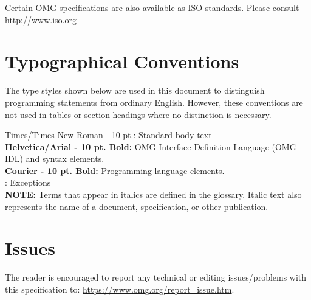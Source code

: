 Certain OMG specifications are also available as ISO standards. Please consult \url{http://www.iso.org} 

\section*{Typographical Conventions}
The type styles shown below are used in this document to distinguish programming statements from ordinary English. However, these conventions are not used in tables or section headings where no distinction is necessary.

Times/Times New Roman - 10 pt.:  Standard body text\\[\medskipamount]
{\small\sffamily\bfseries{Helvetica/Arial - 10 pt. Bold:}} OMG Interface Definition Language (OMG IDL) and syntax 
elements.\\[\medskipamount]
{\ttfamily\bfseries{Courier - 10 pt. Bold:}}  Programming language elements.\\[\medskipamount]
{\small{}}: Exceptions\\[\medskipamount]

{\bfseries{NOTE:}} Terms that appear in italics are defined in the glossary. Italic text also represents the name of a document, specification, or other publication.

\section*{Issues}

The reader is encouraged to report any technical or editing issues/problems with this specification to: {\url{https://www.omg.org/report\_issue.htm}}.
\vfill\eject



\setcounter{page}{1}


